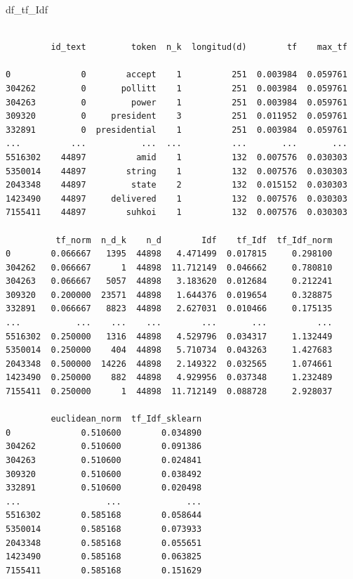 \documentclass[
  11pt,
  a4paper,
]{article}
\newenvironment{Shaded}{\begin{snugshade}}{\end{snugshade}}
\newcommand{\NormalTok}[1]{#1}
\begin{document}
\begin{Shaded}
\begin{Highlighting}[]
\NormalTok{df\_tf\_Idf}
\end{Highlighting}
\end{Shaded}

\begin{verbatim}

         id_text         token  n_k  longitud(d)        tf    max_tf  

0              0        accept    1          251  0.003984  0.059761   
304262         0       pollitt    1          251  0.003984  0.059761   
304263         0         power    1          251  0.003984  0.059761   
309320         0     president    3          251  0.011952  0.059761   
332891         0  presidential    1          251  0.003984  0.059761   
...          ...           ...  ...          ...       ...       ...   
5516302    44897          amid    1          132  0.007576  0.030303   
5350014    44897        string    1          132  0.007576  0.030303   
2043348    44897         state    2          132  0.015152  0.030303   
1423490    44897     delivered    1          132  0.007576  0.030303   
7155411    44897        suhkoi    1          132  0.007576  0.030303   

          tf_norm  n_d_k    n_d        Idf    tf_Idf  tf_Idf_norm  
0        0.066667   1395  44898   4.471499  0.017815     0.298100   
304262   0.066667      1  44898  11.712149  0.046662     0.780810   
304263   0.066667   5057  44898   3.183620  0.012684     0.212241   
309320   0.200000  23571  44898   1.644376  0.019654     0.328875   
332891   0.066667   8823  44898   2.627031  0.010466     0.175135   
...           ...    ...    ...        ...       ...          ...   
5516302  0.250000   1316  44898   4.529796  0.034317     1.132449   
5350014  0.250000    404  44898   5.710734  0.043263     1.427683   
2043348  0.500000  14226  44898   2.149322  0.032565     1.074661   
1423490  0.250000    882  44898   4.929956  0.037348     1.232489   
7155411  0.250000      1  44898  11.712149  0.088728     2.928037   

         euclidean_norm  tf_Idf_sklearn  
0              0.510600        0.034890  
304262         0.510600        0.091386  
304263         0.510600        0.024841  
309320         0.510600        0.038492  
332891         0.510600        0.020498  
...                 ...             ...  
5516302        0.585168        0.058644  
5350014        0.585168        0.073933  
2043348        0.585168        0.055651  
1423490        0.585168        0.063825  
7155411        0.585168        0.151629 
\end{verbatim}
\end{document}
